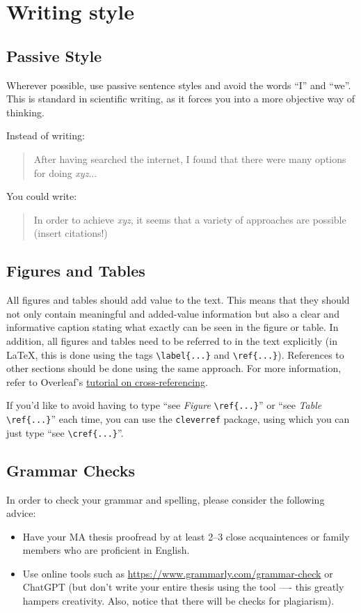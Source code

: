 \section{Writing style}
\subsection{Passive Style}
Wherever possible, use passive sentence styles and avoid the words \enquote{I} and \enquote{we}. This is standard in scientific writing, as it forces you into a more objective way of thinking.

\begin{tcolorbox}[title=Example]
	Instead of writing:
	\begin{quotation}
		After having searched the internet, I found that there were many options for doing \textit{xyz}...
	\end{quotation}
	You could write:
	\begin{quotation}
		In order to achieve \textit{xyz}, it seems that a variety of approaches are possible (insert citations!)
	\end{quotation}
\end{tcolorbox}

\subsection{Figures and Tables}
All figures and tables should add value to the text. This means that they should not only contain meaningful and added-value information but also a clear and informative caption stating what exactly can be seen in the figure or table. In addition, all figures and tables need to be referred to in the text explicitly (in \LaTeX{}, this is done using the tags \lstinline|\label{...}| and \lstinline|\ref{...}|). References to other sections should be done using the same approach. For more information, refer to Overleaf's \href{https://www.overleaf.com/learn/latex/Cross_referencing_sections%2C_equations_and_floats}{tutorial on cross-referencing}.

If you'd like to avoid having to type ``see \textit{Figure} \lstinline|\ref{...}|'' or ``see \textit{Table} \lstinline|\ref{...}|'' each time, you can use the \texttt{cleverref} package, using which you can just type ``see \lstinline|\cref{...}|''.

\subsection{Grammar Checks}
In order to check your grammar and spelling, please consider the following advice:
\begin{itemize}
	\item Have your \gls{MA} thesis proofread by at least 2--3 close acquaintences or family members who are proficient in English.
	\item Use online tools such as \url{https://www.grammarly.com/grammar-check} or ChatGPT (but don't write your entire thesis using the tool ---- this greatly hampers creativity. Also, notice that there will be checks for plagiarism).
\end{itemize}

